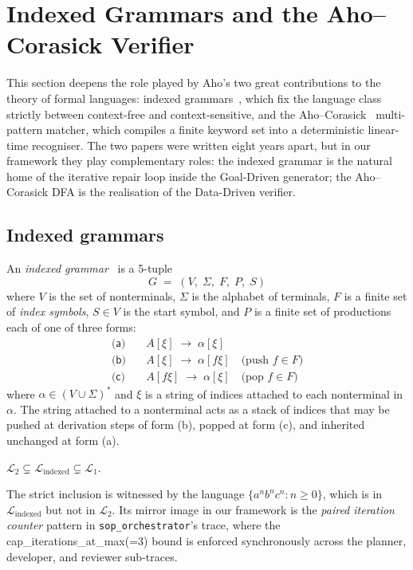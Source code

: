 \section{Indexed Grammars and the Aho--Corasick Verifier}
\label{sec:indexed}

This section deepens the role played by Aho's two great
contributions to the theory of formal languages:
indexed grammars~\cite{aho1968indexed}, which fix the language
class strictly between context-free and context-sensitive, and
the Aho--Corasick~\cite{aho1975corasick} multi-pattern matcher,
which compiles a finite keyword set into a deterministic
linear-time recogniser.  The two papers were written eight years
apart, but in our framework they play complementary roles: the
indexed grammar is the natural home of the iterative repair loop
inside the Goal-Driven generator; the Aho--Corasick DFA is the
realisation of the Data-Driven verifier.

\subsection{Indexed grammars}

An \emph{indexed grammar}~\cite{aho1968indexed} is a 5-tuple
\[
G \;=\; (V,\;\Sigma,\;F,\;P,\;S)
\]
where $V$ is the set of nonterminals, $\Sigma$ is the alphabet
of terminals, $F$ is a finite set of \emph{index symbols}, $S\in
V$ is the start symbol, and $P$ is a finite set of productions
each of one of three forms:
\begin{align*}
\textsf{(a)}\quad & A[\xi] \;\to\; \alpha[\xi] \\
\textsf{(b)}\quad & A[\xi] \;\to\; \alpha[f\xi]
                    \quad\text{(push } f\in F \text{)}\\
\textsf{(c)}\quad & A[f\xi] \;\to\; \alpha[\xi]
                    \quad\text{(pop } f\in F \text{)}
\end{align*}
where $\alpha\in (V\cup\Sigma)^*$ and $\xi$ is a string of
indices attached to each nonterminal in $\alpha$.  The string
attached to a nonterminal acts as a stack of indices that may be
pushed at derivation steps of form (b), popped at form (c), and
inherited unchanged at form (a).

\begin{lemma}[Aho 1968]
$\mathcal{L}_2 \subsetneq \mathcal{L}_{\mathrm{indexed}}
\subsetneq \mathcal{L}_1$.
\end{lemma}

The strict inclusion is witnessed by the language $\{a^n b^n c^n :
n\ge 0\}$, which is in $\mathcal{L}_{\mathrm{indexed}}$ but not in
$\mathcal{L}_2$.  Its mirror image in our framework is the
\emph{paired iteration counter} pattern in
\texttt{sop\_orchestrator}'s trace, where the
\textsf{cap\_iterations\_at\_max(=3)} bound is enforced
synchronously across the planner, developer, and reviewer
sub-traces.

